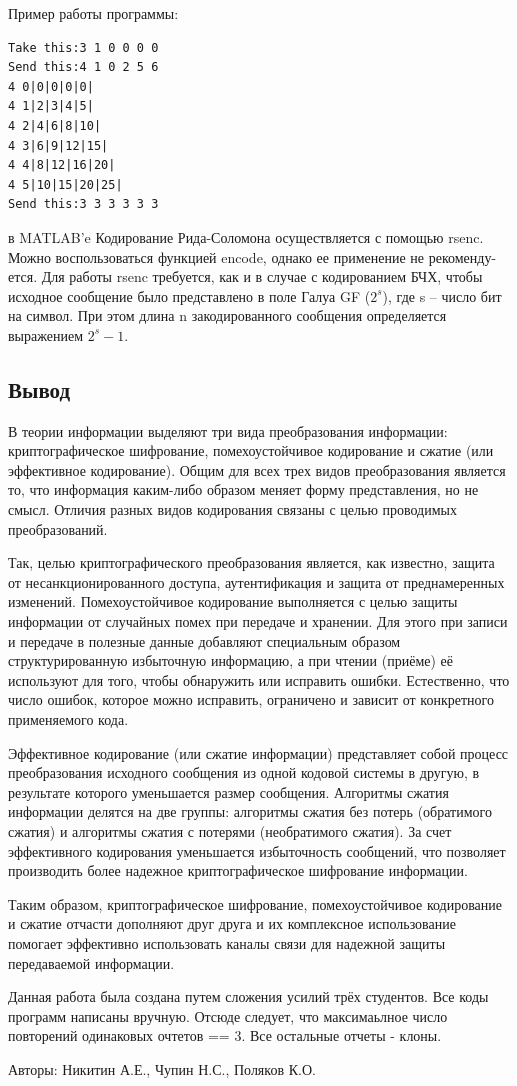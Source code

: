 \documentclass[12pt,a4paper]{article}
\begin{document}
Пример работы программы:
\begin{lstlisting}
Take this:3 1 0 0 0 0  
Send this:4 1 0 2 5 6 
4 0|0|0|0|0|
4 1|2|3|4|5|
4 2|4|6|8|10|
4 3|6|9|12|15|
4 4|8|12|16|20|
4 5|10|15|20|25|
Send this:3 3 3 3 3 3 
\end{lstlisting}

в MATLAB'e Кодирование Рида-Соломона осуществляется с помощью rsenc. Можно
воспользоваться функцией encode, однако ее применение не рекоменду-ется. Для работы rsenc требуется, как и в случае с кодированием БЧХ,
чтобы исходное сообщение было представлено в поле Галуа GF ($2^s$), где s – число бит на символ. При этом длина n закодированного сообщения определяется выражением $2^s -1$.
 
  
\subsection{Вывод}

В теории информации выделяют три вида преобразования информации: криптографическое шифрование, помехоустойчивое кодирование и сжатие (или эффективное кодирование). Общим для всех трех видов преобразования является то, что информация каким-либо образом меняет форму представления, но не смысл. Отличия разных видов кодирования связаны с целью проводимых преобразований.

Так, целью криптографического преобразования является, как известно, защита от несанкционированного доступа, аутентификация и защита от преднамеренных изменений. Помехоустойчивое кодирование выполняется с целью защиты информации от случайных помех при передаче и хранении. Для этого при записи и передаче в полезные данные добавляют специальным образом структурированную избыточную информацию, а при чтении (приёме) её используют для того, чтобы обнаружить или исправить ошибки. Естественно, что число ошибок, которое можно исправить, ограничено и зависит от конкретного применяемого кода.

Эффективное кодирование (или сжатие информации) представляет собой процесс преобразования исходного сообщения из одной кодовой системы в другую, в результате которого уменьшается размер сообщения. Алгоритмы сжатия информации делятся на две группы: алгоритмы сжатия без потерь (обратимого сжатия) и алгоритмы сжатия с потерями (необратимого сжатия). За счет эффективного кодирования уменьшается избыточность сообщений, что позволяет производить более надежное криптографическое шифрование информации.

Таким образом, криптографическое шифрование, помехоустойчивое кодирование и сжатие отчасти дополняют друг друга и их комплексное использование помогает эффективно использовать каналы связи для надежной защиты передаваемой информации.

Данная работа была создана путем сложения усилий трёх студентов. Все коды программ написаны вручную. Отсюде следует, что максимаьлное число повторений одинаковых очтетов == 3. Все остальные отчеты - клоны. 

Авторы: Никитин А.Е., Чупин Н.С., Поляков К.О.
  
\end{document}

